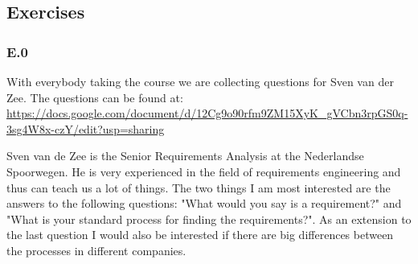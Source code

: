 \documentclass[]{article}
\begin{document}
\subsection*{Exercises} 

\subsubsection*{E.0}
With everybody taking the course we are collecting questions for Sven van der Zee.
The questions can be found at: \url{https://docs.google.com/document/d/12Cg9o90rfm9ZM15XyK_gVCbn3rpGS0q-3sg4W8x-czY/edit?usp=sharing}

Sven van de Zee is the Senior Requirements Analysis at the Nederlandse Spoorwegen.
He is very experienced in the field of requirements engineering and thus can 
teach us a lot of things. The two things I am most interested are the answers 
to the following questions: "What would you say is a requirement?" and 
"What is your standard process for finding the requirements?". As an extension 
to the last question I would also be interested if there are big differences 
between the processes in different companies.  
\end{document}
